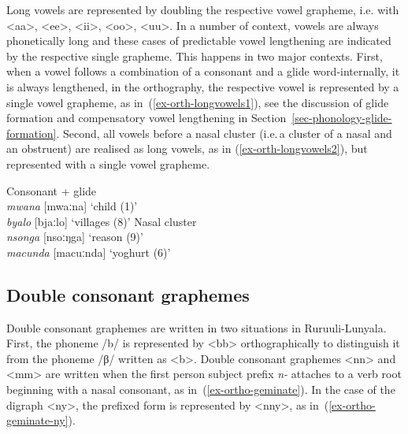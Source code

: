Long vowels are represented by doubling the respective vowel grapheme, i.e. with <aa>, <ee>, <ii>, <oo>, <uu>.
In a number of context, vowels are always phonetically long and these cases of predictable vowel lengthening are indicated by the respective single grapheme. 
This happens in two major contexts. 
First, when a vowel follows a combination of a consonant and a glide word-internally, it is always lengthened, in the orthography, the respective vowel is represented by a single vowel grapheme, as in~(\ref{ex-orth-longvowels1}), see the discussion of glide formation and compensatory vowel lengthening in Section~\ref{sec-phonology-glide-formation}. 
Second, all vowels before a nasal cluster (i.e.\,a cluster of a nasal and an obstruent) are realised as long vowels, as in (\ref{ex-orth-longvowels2}), but represented with a single vowel grapheme. 

\ea \label{ex-orth-longvowels}
\begin{xlist}	
	\ex Consonant + glide\\ \textit{mwana} [mwaːna] ‘child (1)’ \\
	 \textit{byalo} [bjaːlo] ‘villages (8)' \label{ex-orth-longvowels1}
	\ex Nasal cluster\\  \textit{nsonga} [nsoːŋga] ‘reason (9)'\\
	 \textit{macunda} [macuːnda] ‘yoghurt (6)'
	\label{ex-orth-longvowels2}
\end{xlist}	
\z

\subsection{Double consonant graphemes} \label{sec-orthogr-double}

Double consonant graphemes are written in two situations in Ru\-ruu\-li\hyp{}Lu\-nya\-la. 
First, the phoneme /b/ is represented by <bb> orthographically to distinguish it from the phoneme /β/ written as <b>. 
Double consonant graphemes  <nn> and <mm> are written when the first person subject prefix  \textit{n-} attaches to a verb root beginning with a nasal consonant, as in~(\ref{ex-ortho-geminate}). 
In the case of the digraph <ny>, the prefixed form is represented by <nny>, as in~(\ref{ex-ortho-geminate-ny}).

